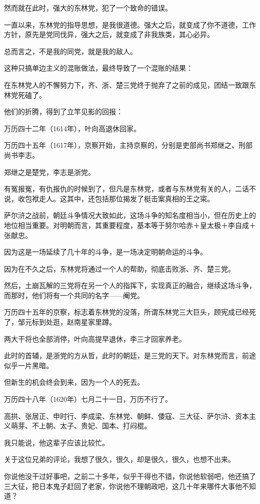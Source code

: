 \begin{multicols}{\theparacolNo}
		然而就在此时，强大的东林党，犯了一个致命的错误。

		一直以来，东林党的指导思想，是我很道德。强大之后，就变成了你不道德，工作方针，原先是党同伐异，强大之后，就变成了非我族类，其心必异。

		总而言之，不是我的同党，就是我的敌人。

		这种只搞单边主义的混账做法，最终导致了一个混账的结果：

		在东林党人的不懈努力下，齐、浙、楚三党终于抛弃了之前的成见，团结一致跟东林党死磕了。

		他们的折腾，得到了立竿见影的回报：

		万历四十二年（1614年），叶向高退休回家。

		万历四十五年（1617年），京察开始，主持京察的，分别是吏部尚书郑继之、刑部尚书李志。

		郑继之是楚党，李志是浙党。

		有冤报冤，有仇报仇的时候到了，但凡是东林党，或者与东林党有关的人，二话不说，收包袱走人。这其中，还包括那位揭发了梃击案真相的王之寀。

		萨尔浒之战前，朝廷斗争情况大致如此，这场斗争的知名度相当小，但在历史上的地位相当重要。对明朝而言，其重要程度，基本等于努尔哈赤＋皇太极＋李自成＋张献忠。

		因为这是一场延续了几十年的斗争，是一场决定明朝命运的斗争。

		因为在不久之后，东林党将通过一个人的帮助，彻底击败浙、齐、楚三党。

		然后，土崩瓦解的三党将在另一个人的指挥下，实现真正的融合，继续这场斗争，而那时，他们将有一个共同的名字——阉党。

		万历四十五年的京察，标志着东林党的没落，所谓东林党三大巨头，顾宪成已经死了，邹元标到处逛，赵南星家里蹲。

		两大干将也全部消停，叶向高提早退休，李三才回家养老。

		此时的首辅，是浙党的方从哲，此时的朝廷，是三党的天下。对东林党而言，前途似乎一片黑暗。

		但新生的机会终会到来，因为一个人的死去。

		万历四十八年（1620年）七月二十一日，万历不行了。

		高拱、张居正、申时行、李成梁、东林党、朝鲜、倭寇、三大征、萨尔浒、资本主义萌芽、不上朝、太子、贵妃、国本、打闷棍。

		我只能说，他这辈子应该比较忙。

		关于这位兄弟的评论，我想了很久，很久，却是很久，很久，也想不出来。

		你说他没干过好事吧，之前二十多年，似乎干得也不错，你说他软弱吧，他还搞了三大征，把日本鬼子赶回了老家，你说他不理朝政吧，这几十年来哪件大事他不知道？


\end{multicols}

